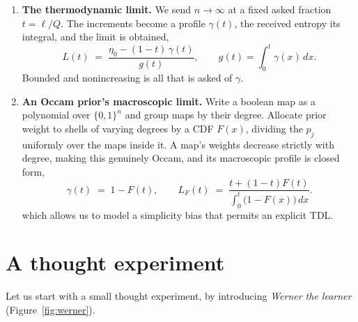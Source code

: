 \documentclass[11pt]{article}
\let\stdsection\section
\renewcommand{\section}{\clearpage\stdsection}
\begin{document}
\begin{enumerate}
\item \textbf{The thermodynamic limit.} We send $n \to \infty$ at a fixed asked fraction
$t = \ell/Q$. The increments become a profile $\gamma(t)$, the received
entropy its integral, and the limit is obtained,
%
\[
  L(t) \;=\; \frac{\eta_0 - (1-t)\,\gamma(t)}{g(t)},
  \qquad
  g(t) = \int_0^t \gamma(x)\,dx .
\]
%
Bounded and nonincreasing is all that is asked of $\gamma$.

\item \textbf{An Occam prior's macroscopic limit.} Write a boolean map as a polynomial
over $\{0,1\}^n$ and group maps by their degree. Allocate prior weight to shells of varying degrees by a CDF
$F(x)$, dividing the $p_j$ uniformly over the maps inside it. A map's weights decrease strictly with degree, 
making this genuinely Occam, and its macroscopic profile is closed form,
%
\[
  \gamma(t) \;=\; 1 - F(t),
  \qquad
  L_F(t) \;=\; \frac{t + (1-t)F(t)}{\int_0^t \big(1-F(x)\big)\,dx} .
\]
%
which allows us to model a simplicity bias that permits an explicit TDL.
\end{enumerate}

\clearpage
\tableofcontents

\section{A thought experiment}\label{sec:thought}

Let us start with a small thought experiment, by introducing
\emph{Werner the learner} (Figure~\ref{fig:werner}).
\end{document}
